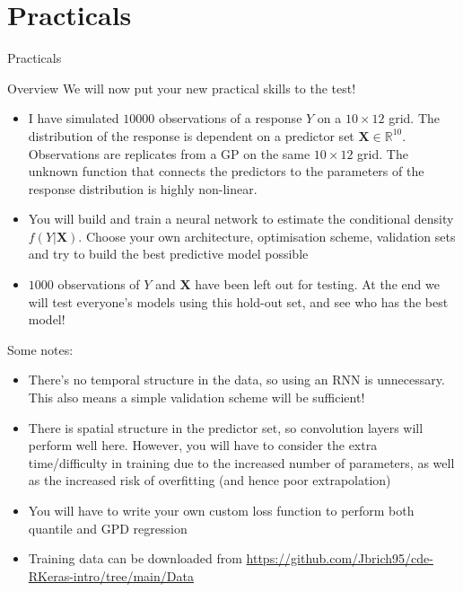 \documentclass{beamer}
\begin{document}
\section{Practicals}
\begin{frame}
\begin{center}
\Huge Practicals
\end{center}
\end{frame}
\begin{frame}{Overview}
We will now put your new practical skills to the test!
\begin{itemize}
\item I have simulated $10000$ observations of a response $Y$ on a $10\times 12$ grid. The distribution of the response is dependent on a predictor set $\mathbf{X}\in\mathbb{R}^{10}$. Observations are replicates from a GP on the same $10\times 12$ grid. The unknown function that connects the predictors to the parameters of the response distribution is highly non-linear.
\item You will build and train a neural network to estimate the conditional density $f(Y|\mathbf{X})$. Choose your own architecture, optimisation scheme, validation sets and try to build the best predictive model possible
\item $1000$ observations of $Y$ and $\mathbf{X}$ have been left out for testing. At the end we will test everyone's models using this hold-out set, and see who has the best model!
\end{itemize}
\end{frame}
\begin{frame}
Some notes:
\begin{itemize}
\item There's no temporal structure in the data, so using an RNN is unnecessary. This also means a simple validation scheme will be sufficient!
\item There is spatial structure in the predictor set, so convolution layers will perform well here. However, you will have to consider the extra time/difficulty in training due to the increased number of parameters, as well as the increased risk of overfitting (and hence poor extrapolation)
\item You will have to write your own custom loss function to perform both quantile and GPD regression
\item Training data can be downloaded from \url{https://github.com/Jbrich95/cde-RKeras-intro/tree/main/Data}
\end{itemize}
\end{frame}
\end{document}
